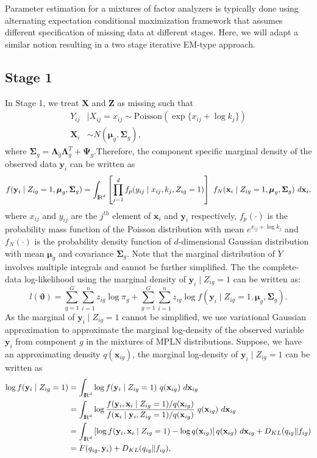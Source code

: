\documentclass[12pt]{article}
\newcommand{\real}{\text{\rm I\hspace{-0.6mm}R}}
\newcommand{\bX}{\mathbf{X}}
\newcommand{\bZ}{\mathbf{Z}}
\newcommand{\bx}{\mathbf{x}}
\newcommand{\by}{\mathbf{y}}
\newcommand{\bmu}{\boldsymbol{\mu}}
\newcommand{\bSigma}{\boldsymbol{\Sigma}}
\newcommand{\bLambda}{\boldsymbol{\Lambda}}
\newcommand{\bPsi}{\boldsymbol{\Psi}}
\begin{document}
Parameter estimation for a mixtures of factor analyzers is typically done using alternating expectation conditional maximization framework that assumes different specification of missing data at different stages. Here, we will adapt a similar notion resulting in a two stage iterative EM-type approach.

\subsection{Stage 1}
In Stage 1, we treat $\bX$ and $\bZ$ as missing such that
\begin{align*}
Y_{ij}&\mid X_{ij}=x_{ij}\sim \text{Poisson}\left(\exp\{x_{ij}+\log{k_j}\}\right)\\
\bX_i&\sim N(\bmu_g,\bSigma_g),
\end{align*}
where $\bSigma_g=\bLambda_g\bLambda_g^T+\bPsi_g$.Therefore, the component specific marginal density of the observed data $\by_i$ can be written as
\vspace{-0.05in}
\begin{align*}
 f(\by_i\mid Z_{ig}=1,\bmu_g,\bSigma_g)=\int_{\real^d} \left[ \prod _{j=1}^d f_p(y_{ij}\mid x_{ij},k_j, Z_{ig}=1)\right] ~f_N(\bx_i\mid Z_{ig}=1,\bmu_g,\bSigma_g)~d\bx_i,
\end{align*}
where $x_{ij}$ and $y_{ij}$ are the $j^{th}$ element of $\bx_i$ and $\by_i$ respectively, $f_p(\cdot)$ is the probability mass function of the Poisson distribution with mean $e^{x_{ij}+\log k_j}$ and $f_N(\cdot)$ is the probability density function of  $d$-dimensional Gaussian distribution with mean $\bmu_g$ and covariance $\bSigma_g$. Note that the marginal distribution of $Y$ involves multiple integrals and cannot be further simplified. The the complete-data log-likelihood using the marginal density of $\by_i\mid Z_{ig}=1$ can be written as:
$$l(\boldsymbol{\vartheta})=\sum_{g=1}^G\sum_{i=1}^n z_{ig}\log \pi_g+ \sum_{g=1}^G\sum_{i=1}^n z_{ig}\log f(\by_{i}\mid Z_{ig}=1, \bmu_g,\bSigma_g).$$
As the marginal of $\by_i\mid Z_{ig}=1$ cannot be simplified, we use variational Gaussian approximation to approximate the marginal log-density of the observed variable $\by_i$ from component $g$ in the mixtures of MPLN distributions. Suppose, we have an approximating density $q(\bx_{ig})$, the marginal log-density of $\by_i\mid Z_{ig}=1$ can be written as
\begin{align*}
\log f(\by_i\mid Z_{ig}=1) &= \int_{\real^d} \log f(\by_i\mid Z_{ig}=1) ~q(\bx_{ig}) ~d\bx_{ig}\\
&=  \int_{\real^d} \log \frac{f(\by_i,\bx_i\mid Z_{ig}=1)/q(\bx_{ig})}{f(\bx_i\mid\by_i,Z_{ig}=1)/q(\bx_{ig})} ~q(\bx_{ig}) ~d\bx_{ig}\\
&= \int_{\real^d} \left[\log f(\by_i,\bx_i\mid Z_{ig}=1) - \log q(\bx_{ig})\right] q(\bx_{ig}) ~ d\bx_{ig} + D_{KL}(q_{ig}\|f_{ig}) \\
&= F(q_{ig},\by_i) + D_{KL}(q_{ig}\|f_{ig}),
\end{align*}
\end{document}
